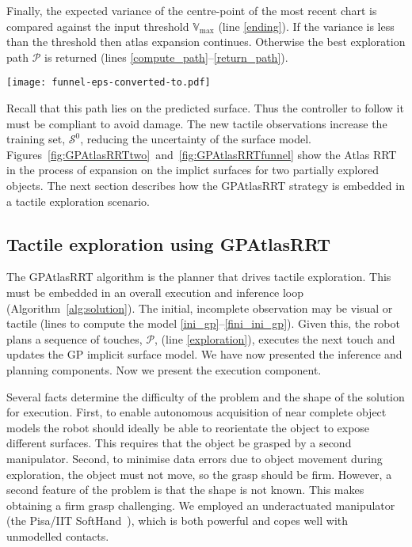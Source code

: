 Finally, the expected variance of the centre-point of the most recent chart is compared against the input threshold $\mathbb{V}_{\max}$ (line \ref{ending}). If the variance is less than the threshold then atlas expansion continues. Otherwise the best exploration path $\mathcal{P}$ is returned (lines \ref{compute_path}--\ref{return_path}). 
\begin{figure*}[hbt]
    \centering
    \texttt{[image: funnel-eps-converted-to.pdf]}
    \caption{ A funnel (left-upper corner) is first seen by a depth camera. The segmented 3D points are shown in blue in the left figure to form the training set $\mathcal{S}^0$. The predicted shape by the GP on this set is shown in the middle obtained via a marching cube sampling algorithm. However, the GPAtlasRRT strategy does not require the explicit form of the predicted surface, as shown in the right figure. It works with the implicit form to devise the next-best tactile exploration shown in brighter green.}
    \label{fig:GPAtlasRRTfunnel}
\end{figure*}
Recall that this path lies on the predicted surface. Thus the controller to follow it must be compliant to avoid damage. The new tactile observations increase the training set, $\mathcal{S}^0$, reducing  the uncertainty of the surface model. Figures~\ref{fig:GPAtlasRRTtwo}~and~\ref{fig:GPAtlasRRTfunnel} show the Atlas RRT in the process of expansion on the implict surfaces for two partially explored objects. The next section describes how the GPAtlasRRT strategy is  embedded in a tactile exploration scenario.

\subsection{Tactile exploration using GPAtlasRRT}
\label{sec:gpatlasrrt_tactile_exploration}

The GPAtlasRRT algorithm is the planner that drives tactile exploration. This must be embedded in an overall execution and inference loop (Algorithm~\ref{alg:solution}). The initial, incomplete observation may be visual or tactile (lines to compute the model \ref{ini_gp}--\ref{fini_ini_gp}). Given this, the robot plans a sequence of touches, $\mathcal{P}$, (line \ref{exploration}), executes the next touch and updates the GP implicit surface model. We have now presented the inference and planning components. Now we present the execution component.

Several facts determine the difficulty of the problem and the shape of the solution for execution. First, to enable autonomous acquisition of near complete object models the robot should ideally be able to reorientate the object to expose different surfaces. This requires that the object be grasped by a second manipulator. Second, to minimise data errors due to object movement during exploration, the object must not move, so the grasp should be firm. However, a second feature of the problem is that the shape is not known. This makes obtaining a firm grasp challenging. We employed an underactuated manipulator (the Pisa/IIT
SoftHand~\cite{Catalano2014Adaptive}), which is both powerful and copes well with unmodelled contacts. 


